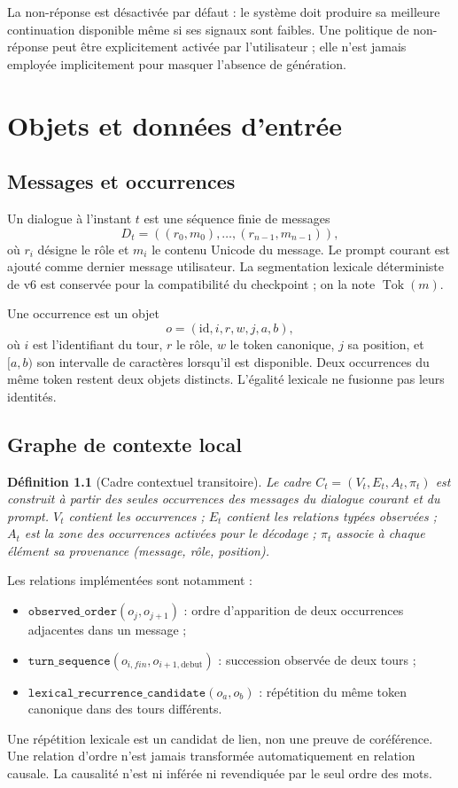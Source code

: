\documentclass[11pt,a4paper]{report}
\newtheorem{definition}{Définition}[chapter]
\begin{document}
La non-réponse est désactivée par défaut : le système doit produire sa meilleure continuation disponible même si ses signaux sont faibles. Une politique de non-réponse peut être explicitement activée par l'utilisateur ; elle n'est jamais employée implicitement pour masquer l'absence de génération.

\chapter{Objets et données d'entrée}
\section{Messages et occurrences}
Un dialogue à l'instant $t$ est une séquence finie de messages
\[
D_t=((r_0,m_0),\ldots,(r_{n-1},m_{n-1})),
\]
où $r_i$ désigne le rôle et $m_i$ le contenu Unicode du message. Le prompt courant est ajouté comme dernier message utilisateur. La segmentation lexicale déterministe de v6 est conservée pour la compatibilité du checkpoint ; on la note $\operatorname{Tok}(m)$.

Une occurrence est un objet
\[
o=(\mathrm{id},i,r,w,j,a,b),
\]
où $i$ est l'identifiant du tour, $r$ le rôle, $w$ le token canonique, $j$ sa position, et $[a,b)$ son intervalle de caractères lorsqu'il est disponible. Deux occurrences du même token restent deux objets distincts. L'égalité lexicale ne fusionne pas leurs identités.

\section{Graphe de contexte local}
\begin{definition}[Cadre contextuel transitoire]
Le cadre $C_t=(V_t,E_t,A_t,\pi_t)$ est construit à partir des seules occurrences des messages du dialogue courant et du prompt. $V_t$ contient les occurrences ; $E_t$ contient les relations typées observées ; $A_t$ est la zone des occurrences activées pour le décodage ; $\pi_t$ associe à chaque élément sa provenance (message, rôle, position).
\end{definition}

Les relations implémentées sont notamment :
\begin{itemize}[nosep]
\item $\texttt{observed\_order}(o_j,o_{j+1})$ : ordre d'apparition de deux occurrences adjacentes dans un message ;
\item $\texttt{turn\_sequence}(o_{i,fin},o_{i+1,\text{debut}})$ : succession observée de deux tours ;
\item $\texttt{lexical\_recurrence\_candidate}(o_a,o_b)$ : répétition du même token canonique dans des tours différents.
\end{itemize}
Une répétition lexicale est un candidat de lien, non une preuve de coréférence. Une relation d'ordre n'est jamais transformée automatiquement en relation causale. La causalité n'est ni inférée ni revendiquée par le seul ordre des mots.
\end{document}
